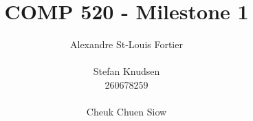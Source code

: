 \documentclass{article}
\begin{document}
\pagestyle{empty}

\title{COMP 520 - Milestone 1}
\author{
  \begin{minipage}{0.2\textwidth}
  \begin{flushleft}
    Alexandre St-Louis Fortier\\
  \end{flushleft}
  \end{minipage}
  \begin{minipage}{0.2\textwidth}
  \begin{center}
    Stefan Knudsen \\
    260678259 \\
  \end{center}
  \end{minipage}
  \begin{minipage}{0.2\textwidth}
  \begin{flushright}
    Cheuk Chuen Siow \\
  \end{flushright}
  \end{minipage}
}
\maketitle

\section*{}
\end{document}
